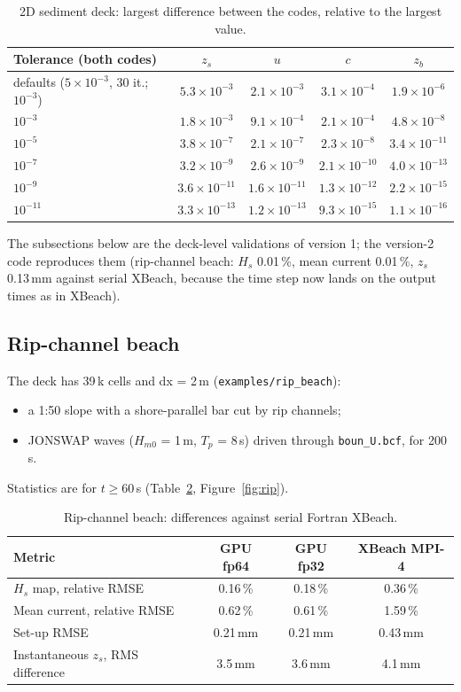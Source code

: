 \documentclass[11pt,a4paper]{article}
\newcommand{\code}[1]{\texttt{#1}}
\begin{document}
\begin{table}[h]\centering\small
\caption{2D sediment deck: largest difference between the codes, relative to the largest value.}\label{tab:tol}
\begin{tabular}{lcccc}
\toprule
Tolerance (both codes) & $z_s$ & $u$ & $c$ & $z_b$ \\
\midrule
defaults ($5\times10^{-3}$, 30 it.; $10^{-3}$) & $5.3\times10^{-3}$ & $2.1\times10^{-3}$ & $3.1\times10^{-4}$ & $1.9\times10^{-6}$ \\
$10^{-3}$ & $1.8\times10^{-3}$ & $9.1\times10^{-4}$ & $2.1\times10^{-4}$ & $4.8\times10^{-8}$ \\
$10^{-5}$ & $3.8\times10^{-7}$ & $2.1\times10^{-7}$ & $2.3\times10^{-8}$ & $3.4\times10^{-11}$ \\
$10^{-7}$ & $3.2\times10^{-9}$ & $2.6\times10^{-9}$ & $2.1\times10^{-10}$ & $4.0\times10^{-13}$ \\
$10^{-9}$ & $3.6\times10^{-11}$ & $1.6\times10^{-11}$ & $1.3\times10^{-12}$ & $2.2\times10^{-15}$ \\
$10^{-11}$ & $3.3\times10^{-13}$ & $1.2\times10^{-13}$ & $9.3\times10^{-15}$ & $1.1\times10^{-16}$ \\
\bottomrule
\end{tabular}
\end{table}

The subsections below are the deck-level validations of version 1; the version-2 code reproduces them (rip-channel beach: $H_s$ 0.01\,\%, mean current 0.01\,\%,
$z_s$ 0.13\,mm against serial XBeach, because the time step now lands on the output times as in XBeach).

\subsection{Rip-channel beach}
The deck has 39\,k cells and dx = 2\,m (\code{examples/rip\_beach}):
\begin{itemize}
\item a 1:50 slope with a shore-parallel bar cut by rip channels;
\item JONSWAP waves ($H_{m0}$ = 1\,m, $T_p$ = 8\,s) driven through \code{boun\_U.bcf}, for 200\,s.
\end{itemize}
Statistics are for $t \geq 60$\,s (Table~\ref{tab:rip}, Figure~\ref{fig:rip}).

\begin{table}[h]\centering\small
\caption{Rip-channel beach: differences against serial Fortran XBeach.}\label{tab:rip}
\begin{tabular}{lccc}
\toprule
Metric & GPU fp64 & GPU fp32 & XBeach MPI-4 \\
\midrule
$H_s$ map, relative RMSE & 0.16\,\% & 0.18\,\% & 0.36\,\% \\
Mean current, relative RMSE & 0.62\,\% & 0.61\,\% & 1.59\,\% \\
Set-up RMSE & 0.21\,mm & 0.21\,mm & 0.43\,mm \\
Instantaneous $z_s$, RMS difference & 3.5\,mm & 3.6\,mm & 4.1\,mm \\
\bottomrule
\end{tabular}
\end{table}
\end{document}
